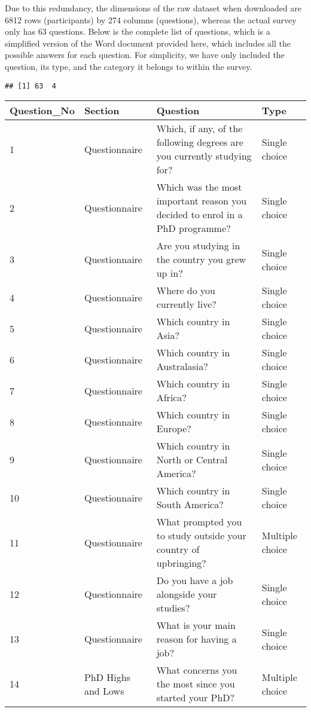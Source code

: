 \documentclass[
]{article}
\begin{document}
Due to this redundancy, the dimensions of the raw dataset when
downloaded are 6812 rows (participants) by 274 columns (questions),
whereas the actual survey only has 63 questions. Below is the complete
list of questions, which is a simplified version of the Word document
provided here, which includes all the possible answers for each
question. For simplicity, we have only included the question, its type,
and the category it belongs to within the survey.

\begin{verbatim}
## [1] 63  4
\end{verbatim}

\begin{tabular}{l|l|l|l}
\hline
Question\_No & Section & Question & Type\\
\hline
1 & Questionnaire & Which, if any, of the following degrees are you currently studying for? & Single choice\\
\hline
2 & Questionnaire & Which was the most important reason you decided to enrol in a PhD programme? & Single choice\\
\hline
3 & Questionnaire & Are you studying in the country you grew up in? & Single choice\\
\hline
4 & Questionnaire & Where do you currently live? & Single choice\\
\hline
5 & Questionnaire & Which country in Asia? & Single choice\\
\hline
6 & Questionnaire & Which country in Australasia? & Single choice\\
\hline
7 & Questionnaire & Which country in Africa? & Single choice\\
\hline
8 & Questionnaire & Which country in Europe? & Single choice\\
\hline
9 & Questionnaire & Which country in North or Central America? & Single choice\\
\hline
10 & Questionnaire & Which country in South America? & Single choice\\
\hline
11 & Questionnaire & What prompted you to study outside your country of upbringing? & Multiple choice\\
\hline
12 & Questionnaire & Do you have a job alongside your studies? & Single choice\\
\hline
13 & Questionnaire & What is your main reason for having a job? & Single choice\\
\hline
14 & PhD Highs and Lows & What concerns you the most since you started your PhD? & Multiple choice\\

\end{tabular}
\end{document}
